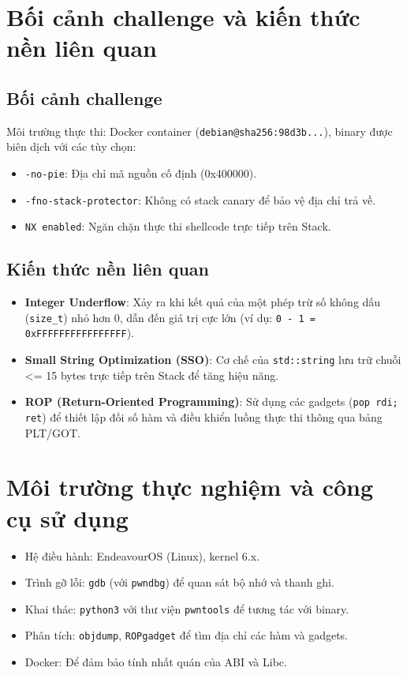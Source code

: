 \documentclass[12pt,a4paper]{report}
\begin{document}
\chapter{Bối cảnh challenge và kiến thức nền liên quan}
\section{Bối cảnh challenge}
Môi trường thực thi: Docker container (\texttt{debian@sha256:98d3b...}), binary được biên dịch với các tùy chọn:
\begin{itemize}
    \item \texttt{-no-pie}: Địa chỉ mã nguồn cố định (0x400000).
    \item \texttt{-fno-stack-protector}: Không có stack canary để bảo vệ địa chỉ trả về.
    \item \texttt{NX enabled}: Ngăn chặn thực thi shellcode trực tiếp trên Stack.
\end{itemize}

\section{Kiến thức nền liên quan}
\begin{itemize}
    \item \textbf{Integer Underflow}: Xảy ra khi kết quả của một phép trừ số không dấu (\texttt{size\_t}) nhỏ hơn 0, dẫn đến giá trị cực lớn (ví dụ: \texttt{0 - 1 = 0xFFFFFFFFFFFFFFFF}).
    \item \textbf{Small String Optimization (SSO)}: Cơ chế của \texttt{std::string} lưu trữ chuỗi <= 15 bytes trực tiếp trên Stack để tăng hiệu năng.
    \item \textbf{ROP (Return-Oriented Programming)}: Sử dụng các gadgets (\texttt{pop rdi; ret}) để thiết lập đối số hàm và điều khiển luồng thực thi thông qua bảng PLT/GOT.
\end{itemize}

\chapter{Môi trường thực nghiệm và công cụ sử dụng}
\begin{itemize}
    \item Hệ điều hành: EndeavourOS (Linux), kernel 6.x.
    \item Trình gỡ lỗi: \texttt{gdb} (với \texttt{pwndbg}) để quan sát bộ nhớ và thanh ghi.
    \item Khai thác: \texttt{python3} với thư viện \texttt{pwntools} để tương tác với binary.
    \item Phân tích: \texttt{objdump}, \texttt{ROPgadget} để tìm địa chỉ các hàm và gadgets.
    \item Docker: Để đảm bảo tính nhất quán của ABI và Libc.
\end{itemize}
\end{document}
